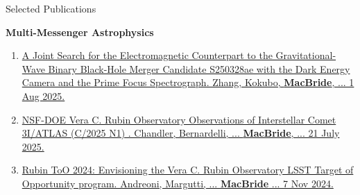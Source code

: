 \begin{rSection}{Selected Publications}
\begin{rSubsection}{\textbf{Multi-Messenger Astrophysics}}{}{}{}
\begin{enumerate}
    \item \href{https://arxiv.org/abs/2508.00291}{A Joint Search for the Electromagnetic Counterpart to the Gravitational-Wave Binary Black-Hole Merger Candidate S250328ae with the Dark Energy Camera and the Prime Focus Spectrograph. Zhang, Kokubo, \textbf{MacBride}, ... 1 Aug 2025.}
    \item \href{https://arxiv.org/pdf/2507.13409}{NSF-DOE Vera C. Rubin Observatory Observations of Interstellar Comet 3I/ATLAS (C/2025 N1) . Chandler, Bernardelli, ... \textbf{MacBride}, ... 21 July 2025.}
    \item \href{https://arxiv.org/abs/2411.04793}{Rubin ToO 2024: Envisioning the Vera C. Rubin Observatory LSST Target of Opportunity program. Andreoni, Margutti, ... \textbf{MacBride} ... 7 Nov 2024.}
\end{enumerate}
\end{rSubsection}


\end{rSection}

